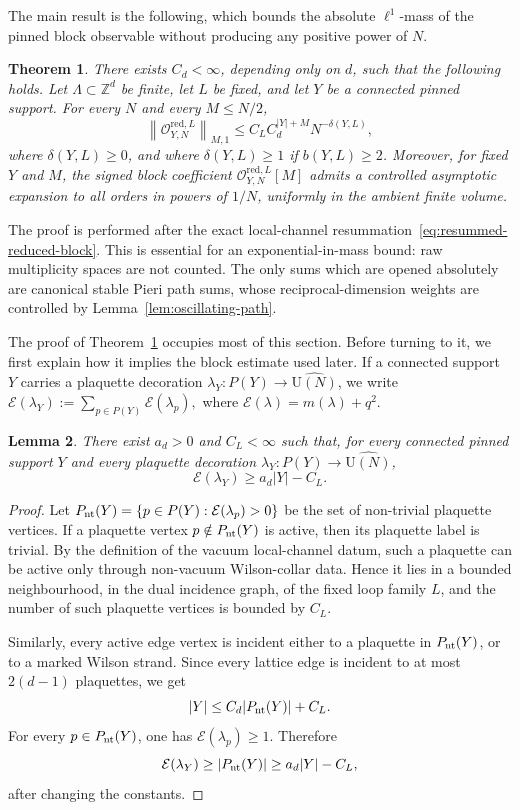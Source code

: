 \documentclass[11pt,a4paper,reqno]{amsart}
\newtheorem{theorem}{Theorem}[section]
\newtheorem{lemma}[theorem]{Lemma}
\theoremstyle{definition}
\theoremstyle{remark}
\newcommand\U{{\mathrm U}}
\newcommand\Z{{\mathbb{Z}}}
\begin{document}
The main result is the following, which bounds the absolute $\ell^1$-mass of the pinned block observable without producing any positive power of $N$.

\begin{theorem}\label{thm:pinned-block}
There exists $C_d<\infty$, depending only on $d$, such that the following holds.  Let $\Lambda\subset\Z^d$ be finite, let $L$ be fixed, and let $Y$ be a connected pinned support.  For every $N$ and every $M\le N/2$,
\begin{equation}
\label{eq:pinned-block-bound}
\left\|\mathcal O_{Y,N}^{\mathrm{red},L}\right\|_{M,1}
\le
C_L C_d^{|Y|+M}N^{-\delta(Y,L)},
\end{equation}
where $\delta(Y,L)\ge0$, and where $\delta(Y,L)\ge1$ if $b(Y,L)\ge2$.  Moreover, for fixed $Y$ and $M$, the signed block coefficient $\mathcal O_{Y,N}^{\mathrm{red},L}[M]$ admits a controlled asymptotic expansion to all orders in powers of $1/N$, uniformly in the ambient finite volume.
\end{theorem}

The proof is performed after the exact local-channel resummation~\eqref{eq:resummed-reduced-block}.  This is essential for an exponential-in-mass bound: raw multiplicity spaces are not counted.  The only sums which are opened absolutely are canonical stable Pieri path sums, whose reciprocal-dimension weights are controlled by Lemma~\ref{lem:oscillating-path}.

The proof of Theorem~\ref{thm:pinned-block} occupies most of this section. Before turning to it, we first explain how it implies the block estimate used later. If a connected support $Y$ carries a plaquette decoration $\lambda_Y:P(Y)\to\widehat{\U(N)}$, we write $\mathcal E(\lambda_Y):=\sum_{p\in P(Y)}\mathcal E(\lambda_p),$ where $\mathcal{E}(\lambda)=m(\lambda)+q^2$.

\begin{lemma}
\label{lem:minimal-support-size}
There exist $a_d>0$ and $C_L<\infty$ such that, for every connected pinned support $Y$ and every plaquette decoration $\lambda_Y:P(Y)\to\widehat{\U(N)}$,
\[
\mathcal{E}(\lambda_Y)\ge a_d |Y|-C_L .
\]
\end{lemma}

\begin{proof}
Let $P_{\rm nt}(Y)=\{p\in P(Y):\mathcal{E}(\lambda_p)>0\}$ be the set of non-trivial plaquette vertices.  If a plaquette vertex $p\notin P_{\rm nt}(Y)$ is active, then its plaquette label is trivial.  By the definition of the vacuum local-channel datum, such a plaquette can be active only through non-vacuum Wilson-collar data.  Hence it lies in a bounded neighbourhood, in the dual incidence graph, of the fixed loop family $L$, and the number of such plaquette vertices is bounded by $C_L$.

Similarly, every active edge vertex is incident either to a plaquette in $P_{\rm nt}(Y)$, or to a marked Wilson strand.  Since every lattice edge is incident to at most $2(d-1)$ plaquettes, we get
\[
|Y|\le C_d |P_{\rm nt}(Y)|+C_L .
\]
For every $p\in P_{\rm nt}(Y)$, one has $\mathcal E(\lambda_p)\ge1$.  Therefore
\[
\mathcal E(\lambda_Y)
\ge |P_{\rm nt}(Y)|
\ge a_d|Y|-C_L,
\]
after changing the constants.
\end{proof}
\end{document}
